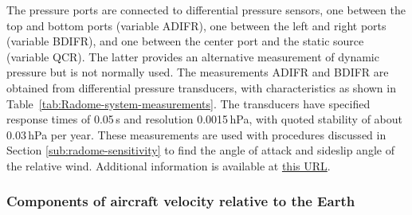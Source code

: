 \documentclass[12pt,twoside,english]{article}\usepackage[]{graphicx}\usepackage[]{color}
\let\OrgIndex\index
\renewcommand*{\index}[1]{\OrgIndex{#1}}
\begin{document}
The pressure ports are connected to differential pressure sensors, one between the top and bottom ports (variable ADIFR),\sindex[var]{ADIFR=pressure difference, bottom minus top source on radome {[}hPa} one between the left and right ports (variable BDIFR), and one between the center port and the static source (variable QCR). The latter provides an alternative measurement of dynamic pressure but is not normally used. The measurements ADIFR and BDIFR are obtained from differential pressure transducers, with characteristics as shown in Table~\ref{tab:Radome-system-measurements}. The transducers have specified response times of 0.05\,s and resolution 0.0015\,hPa, with quoted stability of about 0.03\,hPa per year. These measurements are used with procedures discussed in Section \ref{sub:radome-sensitivity} to find the angle of attack and sideslip angle of the relative wind. Additional information is available at \href{https://www.eol.ucar.edu/instruments/radome-gust-probe-3-d-wind-measurements}{this URL}. 


\subsubsection{Components of aircraft velocity relative to the Earth}
\end{document}
